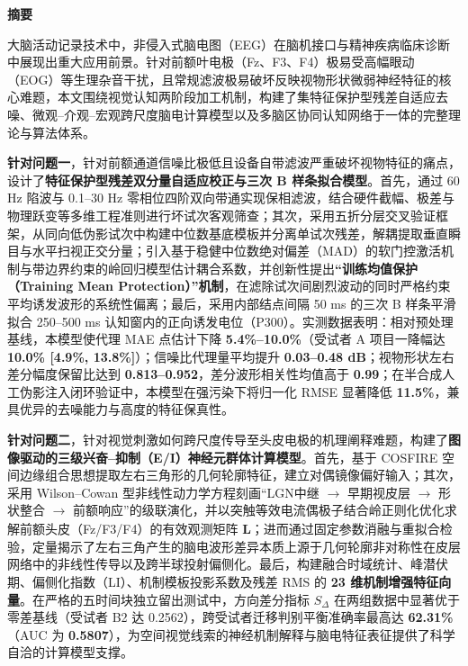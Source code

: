 \documentclass[a4paper]{ctexart}
\numberwithin{figure}{section}       %
\renewcommand{\headrulewidth}{0pt}%
\begin{document}
\thispagestyle{empty} 

\newpage
{}
\setcounter{page}{1}

\renewcommand{\headrulewidth}{0pt} %
\begin{center}
    { \heiti \textbf{摘\quad 要}}
\end{center}
\vspace{-0.2cm}
\hspace*{2\ccwd}大脑活动记录技术中，非侵入式脑电图（EEG）在脑机接口与精神疾病临床诊断中展现出重大应用前景。针对前额叶电极（Fz、F3、F4）极易受高幅眼动（EOG）等生理杂音干扰，且常规滤波极易破坏反映视物形状微弱神经特征的核心难题，本文围绕视觉认知两阶段加工机制，构建了集特征保护型残差自适应去噪、微观--介观--宏观跨尺度脑电计算模型以及多脑区协同认知网络于一体的完整理论与算法体系。

\textbf{针对问题一}，针对前额通道信噪比极低且设备自带滤波严重破坏视物特征的痛点，设计了\textbf{特征保护型残差双分量自适应校正与三次 B 样条拟合模型}。首先，通过 60 Hz 陷波与 0.1--30 Hz 零相位四阶双向带通实现保相滤波，结合硬件截幅、极差与物理跃变等多维工程准则进行坏试次客观筛查；其次，采用五折分层交叉验证框架，从同向低伪影试次中构建中位数基底模板并分离单试次残差，解耦提取垂直瞬目与水平扫视正交分量；引入基于稳健中位数绝对偏差（MAD）的软门控激活机制与带边界约束的岭回归模型估计耦合系数，并创新性提出\textbf{“训练均值保护（Training Mean Protection）”机制}，在滤除试次间剧烈波动的同时严格约束平均诱发波形的系统性偏离；最后，采用内部结点间隔 50 ms 的三次 B 样条平滑拟合 250--500 ms 认知窗内的正向诱发电位（P300）。实测数据表明：相对预处理基线，本模型使代理 MAE 点估计下降 \textbf{5.4\%--10.0\%}（受试者 A 项目一降幅达 \textbf{10.0\% [4.9\%, 13.8\%]}）；信噪比代理量平均提升 \textbf{0.03--0.48 dB}；视物形状左右差分幅度保留比达到 \textbf{0.813--0.952}，差分波形相关性均值高于 \textbf{0.99}；在半合成人工伪影注入闭环验证中，本模型在强污染下将归一化 RMSE 显著降低 \textbf{11.5\%}，兼具优异的去噪能力与高度的特征保真性。

\textbf{针对问题二}，针对视觉刺激如何跨尺度传导至头皮电极的机理阐释难题，构建了\textbf{图像驱动的三级兴奋--抑制（E/I）神经元群体计算模型}。首先，基于 COSFIRE 空间边缘组合思想提取左右三角形的几何轮廓特征，建立对偶镜像偏好输入；其次，采用 Wilson--Cowan 型非线性动力学方程刻画“LGN中继 $\to$ 早期视皮层 $\to$ 形状整合 $\to$ 前额响应”的级联演化，并以突触等效电流偶极子结合岭正则化优化求解前额头皮（Fz/F3/F4）的有效观测矩阵 $\hat{\mathbf{L}}$；进而通过固定参数消融与重拟合检验，定量揭示了左右三角产生的脑电波形差异本质上源于几何轮廓非对称性在皮层网络中的非线性传导以及跨半球投射偏侧化。最后，构建融合时域统计、峰潜伏期、偏侧化指数（LI）、机制模板投影系数及残差 RMS 的 \textbf{23 维机制增强特征向量}。在严格的五时间块独立留出测试中，方向差分指标 $S_\Delta$ 在两组数据中显著优于零差基线（受试者 B2 达 0.2562），跨受试者迁移判别平衡准确率最高达 \textbf{62.31\%}（AUC 为 \textbf{0.5807}），为空间视觉线索的神经机制解释与脑电特征表征提供了科学自洽的计算模型支撑。
\end{document}
